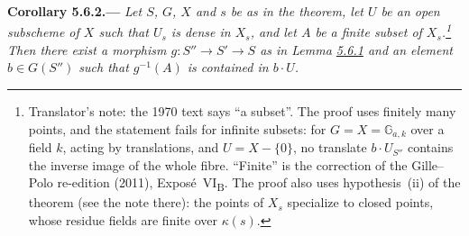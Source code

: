 
\medskip
{}\label{cor:sga3-VIB-5.6.2}%
\noindent\textbf{Corollary 5.6.2.---}
\emph{Let \(S\), \(G\), \(X\) and \(s\) be as in the theorem, let \(U\) be an open subscheme of \(X\) such
that \(U_s\) is dense in \(X_s\), and let \(A\) be a finite subset of \(X_s\).\footnote{Translator's note: the
1970 text says ``a subset''. The proof uses finitely many points, and the statement fails for infinite subsets:
for \(G=X=\mathbb G_{a,k}\) over a field \(k\), acting by translations, and \(U=X-\{0\}\), no translate
\(b\cdot U_{S''}\) contains the inverse image of the whole fibre. ``Finite'' is the correction of the Gille--Polo
re-edition (2011), Expos\'e~VI\textsubscript{B}. The proof also uses hypothesis~(ii) of the theorem (see the note
there): the points of \(X_s\) specialize to closed points, whose residue fields are finite over \(\kappa(s)\).}
Then there exist a morphism \(g:S''\to S'\to S\) as in Lemma \hyperref[lem:sga3-VIB-5.6.1]{5.6.1} and an element
\(b\in G(S'')\) such that \(g^{-1}(A)\) is contained in \(b\cdot U\).}

